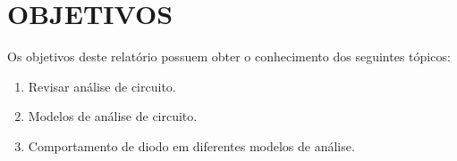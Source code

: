 \chapter{OBJETIVOS}

Os objetivos deste relatório possuem obter o conhecimento dos seguintes tópicos:

\begin{enumerate}
    \item Revisar análise de circuito.
    \item Modelos de análise de circuito.
    \item Comportamento de diodo em diferentes modelos de análise.
\end{enumerate}